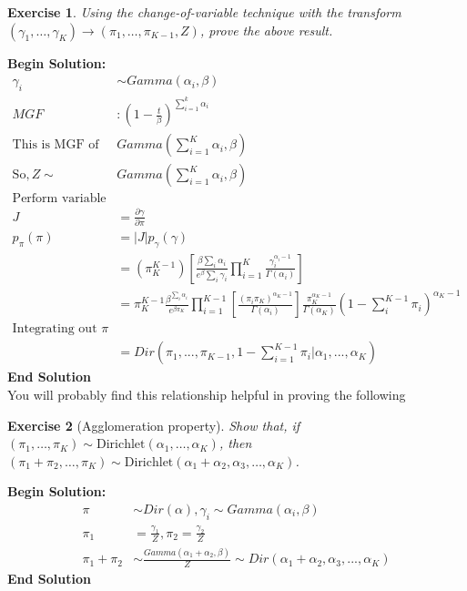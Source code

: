\documentclass[twoside]{article}
\newcounter{lecnum}
\newtheorem{exercise}{Exercise}[lecnum]
\begin{document}
   \begin{exercise}
     Using the change-of-variable technique with the transform $(\gamma_1,\dots,\gamma_K)\rightarrow (\pi_1,\dots, \pi_{K-1},Z)$, prove the above result.
   \end{exercise}
\textbf{Begin Solution:}
\begin{equation*}
\begin{split}
\gamma_i&\sim Gamma(\alpha_i,\beta)\\
MGF&:(1-\frac{t}{\beta})^{\sum_{i=1}^k \alpha_i}\\
\text{This is MGF of }&Gamma(\sum_{i=1}^K \alpha_i,\beta)\\
\text{So}, Z\sim & Gamma(\sum_{i=1}^K \alpha_i,\beta)\\
\text{Perform variable transformation}\\
J &= \frac{\partial \gamma}{\partial \pi}\\
p_\pi(\pi) &= |J|p_\gamma(\gamma)\\
&=(\pi_K^{K-1})\left[\frac{\beta\sum_i \alpha_i}{e{^\beta \sum_i \gamma_i}}\prod_{i=1}^K \frac{\gamma_i^{\alpha_i-1}}{\Gamma(\alpha_i)} \right]\\
&=\pi_K^{K-1}\frac{\beta^{\sum_i \alpha_i}}{e^{\beta \pi_K}} \prod_{i=1}^{K-1}\left[\frac{(\pi_i\pi_K)^{\alpha_K-1}}{\Gamma(\alpha_i)}\right]\frac{\pi_K^{\alpha_K-1}}{\Gamma(\alpha_K)}\left(1-\sum_i^{K-1}\pi_i \right)^{\alpha_K-1}\\
\text{Integrating out }\pi\\
&=Dir(\pi_1,...,\pi_{K-1},1-\sum_{i=1}^{K-1}\pi_i|\alpha_1,...,\alpha_K)
\end{split}
\end{equation*}
\textbf{End Solution}\\
   You will probably find this relationship helpful in proving the following
   
   \begin{exercise}[Agglomeration property]
     Show that, if $(\pi_1,\dots, \pi_K) \sim \mbox{Dirichlet}(\alpha_1,\dots,\alpha_K)$, then $(\pi_1+\pi_2,\dots,\pi_K) \sim \mbox{Dirichlet}(\alpha_1+\alpha_2,\alpha_3,\dots,\alpha_K)$.
   \end{exercise}
\textbf{Begin Solution:}
\begin{equation*}
\begin{split}
\pi&\sim Dir(\alpha), \gamma_i\sim Gamma(\alpha_i,\beta)\\
\pi_1&=\frac{\gamma_1}{Z}, \pi_2=\frac{\gamma_2}{Z}\\
\pi_1 + \pi_2 &\sim \frac{Gamma(\alpha_1+\alpha_2,\beta)}{Z} \sim Dir(\alpha_1+\alpha_2,\alpha_3,...,\alpha_K)
\end{split}
\end{equation*}
\textbf{End Solution}\\
\end{document}

